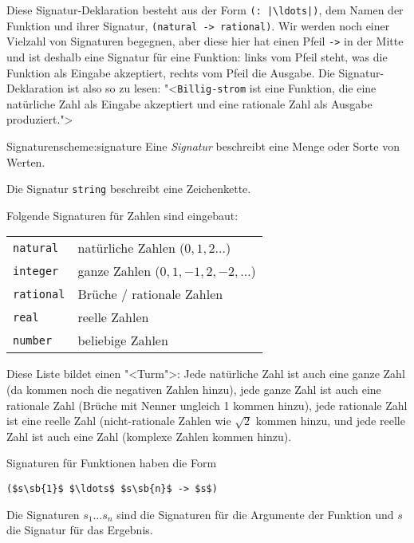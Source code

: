 Diese Signatur-Deklaration besteht aus der Form \lstinline{(: |\ldots|)},
dem Namen der Funktion und ihrer Signatur, \lstinline{(natural -> rational)}. 
Wir werden noch einer Vielzahl von Signaturen begegnen,
aber diese hier hat einen Pfeil \lstinline{->} in der Mitte und ist
deshalb eine Signatur für eine Funktion: links vom Pfeil steht, was
die Funktion als Eingabe akzeptiert, rechts vom Pfeil die Ausgabe. Die
Signatur-Deklaration ist also so zu lesen: "<\lstinline{Billig-strom} ist
eine Funktion, die eine natürliche Zahl als Eingabe akzeptiert und
eine rationale Zahl als Ausgabe produziert.">

\begin{feature}{Signaturen}{scheme:signature}
  Eine \textit{Signatur} beschreibt eine Menge oder
  Sorte von Werten.

  \smallskip
  Die Signatur \lstinline{string}
  beschreibt eine Zeichenkette.
  \smallskip
  
  Folgende Signaturen für Zahlen sind eingebaut:
  \begin{flushleft}
    \begin{tabular}{ll}
      {\lstinline!natural!}\index{natural@\texttt{natural}} & natürliche
                                                         Zahlen\index{natürliche
                                                         Zahlen} ($0, 1, 2\ldots$)\\
      {\lstinline!integer!}\index{integer@\texttt{integer}} & ganze
                                                         Zahlen\index{ganze
                                                         Zahlen} ($0, 1, -1, 2, -2, \ldots$)\\
      {\lstinline!rational!}\index{rational@\texttt{rational}} &
                                                            Brüche\index{Bruch} / rationale Zahlen\index{rationale Zahlen} \\
      {\lstinline!real!}\index{real@\texttt{real}} & reelle
                                                Zahlen\index{reelle Zahlen}\\
      {\lstinline!number!}\index{number@\texttt{number}} & beliebige Zahlen
    \end{tabular}
  \end{flushleft}
  Diese Liste bildet einen "<Turm">: Jede natürliche Zahl ist auch eine
  ganze Zahl (da kommen noch die negativen Zahlen hinzu), jede ganze
  Zahl ist auch eine rationale Zahl (Brüche mit Nenner ungleich 1
  kommen hinzu), jede rationale Zahl ist eine reelle Zahl
  (nicht-rationale Zahlen wie $\sqrt{2}$ kommen hinzu, und jede reelle
  Zahl ist auch eine Zahl (komplexe Zahlen kommen hinzu).

\smallskip
  
  Signaturen für Funktionen haben die Form
%
\begin{lstlisting}
($s\sb{1}$ $\ldots$ $s\sb{n}$ -> $s$)
\end{lstlisting}
%
Die Signaturen $s_1 \ldots s_n$ sind die Signaturen für die Argumente
der Funktion und $s$ die Signatur für das Ergebnis.
\end{feature}

